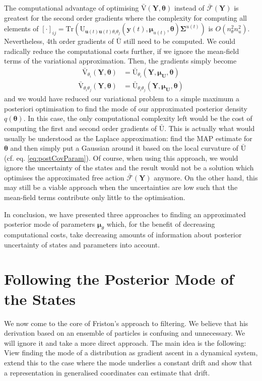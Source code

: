 \documentclass[a4paper,10pt]{article}
\newcommand{\bs}[1]{\mathbf{#1}}					%
\newcommand{\bgs}[1]{\boldsymbol{#1}}				%
\newcommand{\trace}[1]{\mathrm{Tr}\left(#1\right)}					%
\renewcommand{\ss}{u}         %
\newcommand{\so}{y}         %
\renewcommand{\sp}{\theta}    %
\newcommand{\ps}{\bs{\ss}}    %
\newcommand{\po}{\bs{\so}}    %
\newcommand{\pp}{\bgs{\sp}} %
\newcommand{\Ps}{\bs{U}}    %
\newcommand{\Po}{\bs{Y}}    %
\newcommand{\U}{\mathrm{U}}			%
\newcommand{\Ua}{\bar{\mathrm{U}}}		%
\newcommand{\Va}{\bar{\mathrm{V}}}		%
\newcommand{\Fa}{\bar{\mathcal{F}}}		%
\newcommand{\Cov}{\bgs{\Sigma}}			%
\begin{document}
The computational advantage of optimising $\Va(\Po,\pp)$ instead of $\Fa(\Po)$ is greatest for the second order gradients where the complexity for computing all elements of $[\cdot]_{ij} = \trace{\U_{\ps(t)\ps(t)\sp_i\sp_j}(\po(t),\bgs{\mu}_{\ss(t)},\pp)\Cov^{\ss(t)}}$ is $O(n_\sp^2n_\ss^2)$. Nevertheless, 4th order gradients of $\Ua$ still need to be computed. We could radically reduce the computational costs further, if we ignore the mean-field terms of the variational approximation. Then, the gradients simply become
\begin{align}
    \Va_{\sp_i}(\Po,\pp) &= \Ua_{\sp_i}(\Po,\bgs{\mu}_\Ps,\pp)
\end{align}
\begin{align}
    \Va_{\sp_i\sp_j}(\Po,\pp) &= \Ua_{\sp_i\sp_j}(\Po,\bgs{\mu}_\Ps,\pp)
\end{align}
and we would have reduced our variational problem to a simple maximum a posteriori optimisation to find the mode of our approximated posterior density $q(\pp)$. In this case, the only computational complexity left would be the cost of computing the first and second order gradients of $\Ua$. This is actually what would usually be understood as the Laplace approximation: find the MAP estimate for $\pp$ and then simply put a Gaussian around it based on the local curvature of $\Ua$ (cf. eq. \eqref{eq:postCovParam}). Of course, when using this approach, we would ignore the uncertainty of the states and the result would not be a solution which optimises the approximated free action $\Fa(\Po)$ anymore. On the other hand, this may still be a viable approach when the uncertainties are low such that the mean-field terms contribute only little to the optimisation.

In conclusion, we have presented three approaches to finding an approximated posterior mode of parameters $\bgs{\mu}_\sp$ which, for the benefit of decreasing computational costs, take decreasing amounts of information about posterior uncertainty of states and parameters into account.


\section{Following the Posterior Mode of the States}
We now come to the core of Friston's approach to filtering. We believe that his derivation based on an ensemble of particles is confusing and unnecessary. We will ignore it and take a more direct approach. The main idea is the following: View finding the mode of a distribution as gradient ascent in a dynamical system, extend this to the case where the mode underlies a constant drift and show that a representation in generalised coordinates can estimate that drift.
\end{document}
